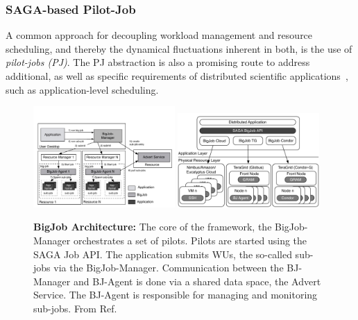 \documentclass[]{svjour3}
\begin{document}
\subsubsection{SAGA-based Pilot-Job}

A common approach for decoupling workload management and resource
scheduling, and thereby the dynamical fluctuations inherent in both,
is the use of \emph{pilot-jobs (PJ)}.  The PJ abstraction is also a
promising route to address additional, as well as specific
requirements of distributed scientific
applications~\cite{ko-efficient,bigjob_cloudcom10}, such as
application-level scheduling.
 
\begin{figure}[t]
  \centering
   \includegraphics[width=0.48\textwidth]{figures/re_bigjob_interactions.pdf}
  \includegraphics[width=0.48\textwidth]{figures/distributed_pilot_job.pdf}

        \caption{\textbf{BigJob Architecture:} The core of the
          framework, the BigJob-Manager orchestrates a set of
          pilots. Pilots are started using the SAGA Job API. The
          application submits WUs, the so-called sub-jobs via the
          BigJob-Manager. Communication between the BJ-Manager and
          BJ-Agent is done via a shared data space, the Advert
          Service. The BJ-Agent is responsible for managing and
          monitoring sub-jobs. From
          Ref.~\cite{saga_bigjob_condor_cloud}}
        \label{fig:figures_re_bigjob_interactions}
\end{figure}
\end{document}
